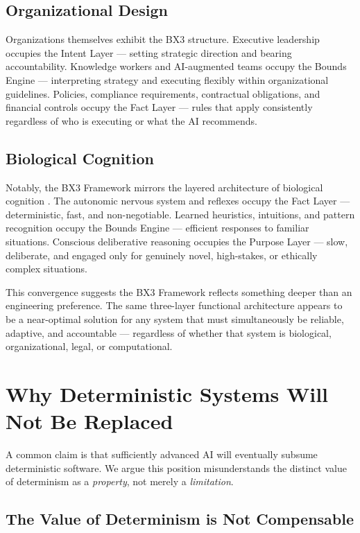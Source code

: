 \documentclass[12pt]{article}
\theoremstyle{plain}
\begin{document}
\subsection{Organizational Design}

Organizations themselves exhibit the BX3 structure. Executive leadership occupies the Intent Layer --- setting strategic direction and bearing accountability. Knowledge workers and AI-augmented teams occupy the Bounds Engine --- interpreting strategy and executing flexibly within organizational guidelines. Policies, compliance requirements, contractual obligations, and financial controls occupy the Fact Layer --- rules that apply consistently regardless of who is executing or what the AI recommends.

\subsection{Biological Cognition}

Notably, the BX3 Framework mirrors the layered architecture of biological cognition \cite{kahneman2011}. The autonomic nervous system and reflexes occupy the Fact Layer --- deterministic, fast, and non-negotiable. Learned heuristics, intuitions, and pattern recognition occupy the Bounds Engine --- efficient responses to familiar situations. Conscious deliberative reasoning occupies the Purpose Layer --- slow, deliberate, and engaged only for genuinely novel, high-stakes, or ethically complex situations.

This convergence suggests the BX3 Framework reflects something deeper than an engineering preference. The same three-layer functional architecture appears to be a near-optimal solution for any system that must simultaneously be reliable, adaptive, and accountable --- regardless of whether that system is biological, organizational, legal, or computational.

\section{Why Deterministic Systems Will Not Be Replaced}
\label{sec:determinism}

A common claim is that sufficiently advanced AI will eventually subsume deterministic software. We argue this position misunderstands the distinct value of determinism as a \textit{property}, not merely a \textit{limitation}.

\subsection{The Value of Determinism is Not Compensable}
\end{document}
